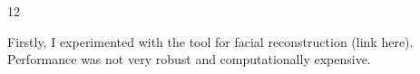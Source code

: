 \normalsize{12}

Firstly, I experimented with the tool for facial reconstruction (link here).  Performance was not very robust and computationally expensive.
